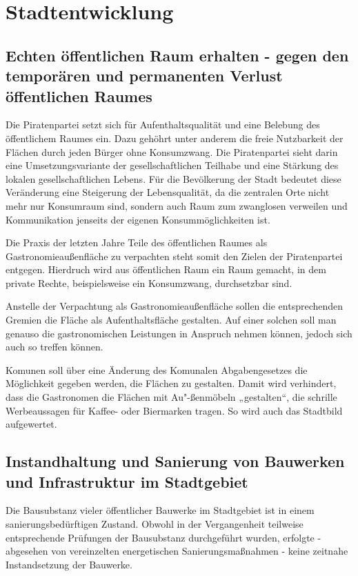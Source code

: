 \chapter{Stadtentwicklung}

  \section{Echten öffentlichen Raum erhalten - gegen den temporären und 
  permanenten Verlust öffentlichen Raumes}
  
  Die Piratenpartei setzt sich für Aufenthaltsqualität und eine Belebung des 
  öffentlichem Raumes ein. Dazu gehöhrt unter anderem die freie Nutzbarkeit 
  der Flächen durch jeden Bürger ohne Konsumzwang. Die Piratenpartei sieht 
  darin eine Umsetzungsvariante der gesellschaftlichen Teilhabe und eine 
  Stärkung des lokalen gesellschaftlichen Lebens. Für die Bevölkerung der 
  Stadt bedeutet diese Veränderung eine Steigerung der Lebensqualität, da die 
  zentralen Orte nicht mehr nur Konsumraum sind, sondern auch Raum zum 
  zwanglosen verweilen und Kommunikation jenseits der eigenen 
  Konsummöglichkeiten ist.
  
  Die Praxis der letzten Jahre Teile des öffentlichen Raumes als 
  Gastronomieaußenfläche zu verpachten steht somit den Zielen der 
  Piratenpartei entgegen. Hierdruch wird aus öffentlichen Raum ein Raum 
  gemacht, in dem private Rechte, beispielsweise ein Konsumzwang, durchsetzbar 
  sind.
  
  Anstelle der Verpachtung als Gastronomieaußenfläche sollen die 
  entsprechenden Gremien die Fläche als Aufenthaltsfläche gestalten. Auf einer 
  solchen soll man genauso die gastronomischen Leistungen in Anspruch nehmen 
  können, jedoch sich auch so treffen können.
  
  Komunen soll über eine Änderung des Komunalen Abgabengesetzes die 
  Möglichkeit gegeben werden, die Flächen zu gestalten. Damit wird verhindert, 
  dass die Gastronomen die Flächen mit Au"-ßenmöbeln „gestalten“, die schrille 
  Werbeaussagen für Kaffee- oder Biermarken tragen. So wird auch das Stadtbild 
  aufgewertet.
  
  \section{Instandhaltung und Sanierung von Bauwerken und Infrastruktur im 
  Stadtgebiet}
  
  Die Bausubstanz vieler öffentlicher Bauwerke im Stadtgebiet ist in einem 
  sanierungsbedürftigen Zustand. Obwohl in der Vergangenheit teilweise 
  entsprechende Prüfungen der Bausubstanz durchgeführt wurden, erfolgte - 
  abgesehen von vereinzelten energetischen Sanierungsmaßnahmen - keine 
  zeitnahe Instandsetzung der Bauwerke.
  
